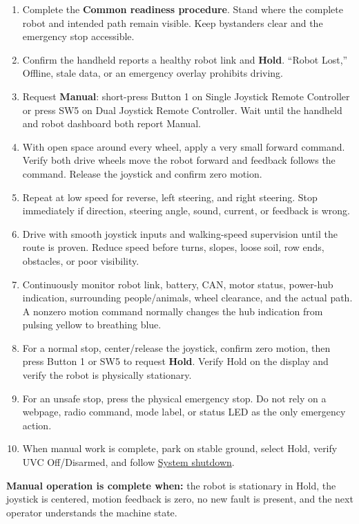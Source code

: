 \documentclass[
  10pt,
  letterpaper,
  openany]{report}
\providecommand{\tightlist}{%
  \setlength{\itemsep}{0pt}\setlength{\parskip}{0pt}}
\begin{document}
\begin{enumerate}
\tightlist
\item
  Complete the \textbf{Common readiness procedure}. Stand where the
  complete robot and intended path remain visible. Keep bystanders clear
  and the emergency stop accessible.
\item
  Confirm the handheld reports a healthy robot link and \textbf{Hold}.
  ``Robot Lost,'' Offline, stale data, or an emergency overlay prohibits
  driving.
\item
  Request \textbf{Manual}: short-press Button 1 on Single Joystick
  Remote Controller or press SW5 on Dual Joystick Remote Controller.
  Wait until the handheld and robot dashboard both report Manual.
\item
  With open space around every wheel, apply a very small forward
  command. Verify both drive wheels move the robot forward and feedback
  follows the command. Release the joystick and confirm zero motion.
\item
  Repeat at low speed for reverse, left steering, and right steering.
  Stop immediately if direction, steering angle, sound, current, or
  feedback is wrong.
\item
  Drive with smooth joystick inputs and walking-speed supervision until
  the route is proven. Reduce speed before turns, slopes, loose soil,
  row ends, obstacles, or poor visibility.
\item
  Continuously monitor robot link, battery, CAN, motor status, power-hub
  indication, surrounding people/animals, wheel clearance, and the
  actual path. A nonzero motion command normally changes the hub
  indication from pulsing yellow to breathing blue.
\item
  For a normal stop, center/release the joystick, confirm zero motion,
  then press Button 1 or SW5 to request \textbf{Hold}. Verify Hold on
  the display and verify the robot is physically stationary.
\item
  For an unsafe stop, press the physical emergency stop. Do not rely on
  a webpage, radio command, mode label, or status LED as the only
  emergency action.
\item
  When manual work is complete, park on stable ground, select Hold,
  verify UVC Off/Disarmed, and follow
  \hyperref[operations-shutdown]{System shutdown}.
\end{enumerate}

\textbf{Manual operation is complete when:} the robot is stationary in
Hold, the joystick is centered, motion feedback is zero, no new fault is
present, and the next operator understands the machine state.
\end{document}

